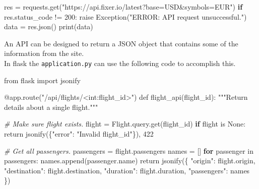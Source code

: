 \documentclass[]{book}
\newenvironment{Shaded}{\begin{snugshade}}{\end{snugshade}}
\newcommand{\KeywordTok}[1]{\textcolor[rgb]{0.13,0.29,0.53}{\textbf{#1}}}
\newcommand{\StringTok}[1]{\textcolor[rgb]{0.31,0.60,0.02}{#1}}
\newcommand{\CommentTok}[1]{\textcolor[rgb]{0.56,0.35,0.01}{\textit{#1}}}
\newcommand{\BuiltInTok}[1]{#1}
\newcommand{\ExtensionTok}[1]{#1}
\newcommand{\NormalTok}[1]{#1}
\begin{document}
\begin{Shaded}
\begin{Highlighting}[]
\ExtensionTok{res}\NormalTok{ = requests.get(}\StringTok{"https://api.fixer.io/latest?base=USD&symbols=EUR"}\NormalTok{)}
\KeywordTok{if} \ExtensionTok{res.status_code}\NormalTok{ != 200:                                            }
    \ExtensionTok{raise}\NormalTok{ Exception(}\StringTok{"ERROR: API request unsuccessful."}\NormalTok{)               }
    \ExtensionTok{data}\NormalTok{ = res.json()                                                     }
    \ExtensionTok{print}\NormalTok{(data)                                                           }
\end{Highlighting}
\end{Shaded}

An API can be designed to return a JSON object that contains some of the
information from the site.\\
In flask the \texttt{application.py} can use the following code to
accomplish this.

\begin{Shaded}
\begin{Highlighting}[]
\ExtensionTok{from}\NormalTok{ flask import jsonify}

\ExtensionTok{@app.route}\NormalTok{(}\StringTok{"/api/flights/<int:flight_id>"}\NormalTok{)                 }
\ExtensionTok{def}\NormalTok{ flight_api(flight_id)}\BuiltInTok{:}                                 
    \StringTok{"""Return details about a single flight."""}            
                                                           
    \CommentTok{# Make sure flight exists.                             }
    \ExtensionTok{flight}\NormalTok{ = Flight.query.get(flight_id)                   }
    \KeywordTok{if} \ExtensionTok{flight}\NormalTok{ is None:                                     }
        \BuiltInTok{return}\NormalTok{ jsonify(\{}\StringTok{"error"}\NormalTok{: }\StringTok{"Invalid flight_id"}\NormalTok{\}), }\ExtensionTok{422}
                                                           
    \CommentTok{# Get all passengers.                                  }
    \ExtensionTok{passengers}\NormalTok{ = flight.passengers                         }
    \ExtensionTok{names}\NormalTok{ = []                                             }
    \KeywordTok{for} \ExtensionTok{passenger}\NormalTok{ in passengers:                           }
        \ExtensionTok{names.append}\NormalTok{(passenger.name)                       }
    \BuiltInTok{return}\NormalTok{ jsonify(\{                                       }
            \StringTok{"origin"}\NormalTok{: }\ExtensionTok{flight.origin}\NormalTok{,                       }
            \StringTok{"destination"}\NormalTok{: }\ExtensionTok{flight.destination}\NormalTok{,             }
            \StringTok{"duration"}\NormalTok{: }\ExtensionTok{flight.duration}\NormalTok{,                   }
            \StringTok{"passengers"}\NormalTok{: }\ExtensionTok{names}                            
\NormalTok{        \})                                                 }
\end{Highlighting}
\end{Shaded}
\end{document}
